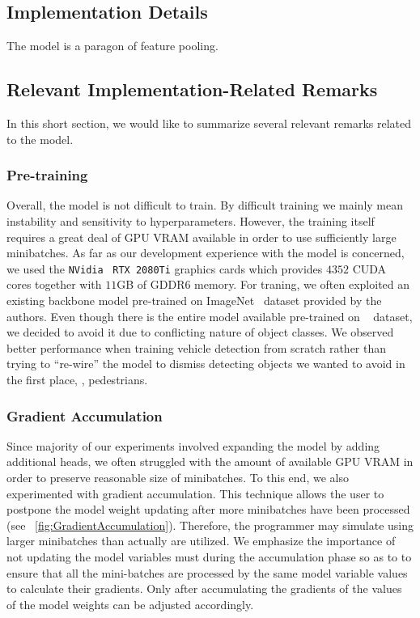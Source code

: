 \subsection{Implementation Details}

The \siammot{} model is a paragon of feature pooling.

\subsection{Relevant Implementation-Related Remarks}

In this short section, we would like to summarize several relevant remarks related to the \siammot{} model.

\subsubsection{Pre-training}

Overall, the model is not difficult to train. By difficult training we mainly mean instability and sensitivity to hyperparameters. However, the training itself requires a great deal of GPU VRAM available in order to use sufficiently large minibatches. As far as our development experience with the \siammot{} model is concerned, we used the \texttt{NVidia}~\cite{webnvidia} \texttt{RTX 2080Ti} graphics cards which provides $4352$ CUDA cores together with $11$GB of GDDR6 memory. For traning, we often exploited an existing backbone model pre-trained on ImageNet~\cite{deng2009imagenet} dataset provided by the authors. Even though there is the entire model available pre-trained on \mscoco{}~\cite{lin2014mscoco} dataset, we decided to avoid it due to conflicting nature of object classes. We observed better performance when training vehicle detection from scratch rather than trying to ``re-wire'' the model to dismiss detecting objects we wanted to avoid in the first place, \egtext{}, pedestrians.

\subsubsection{Gradient Accumulation}

Since majority of our experiments involved expanding the model by adding additional heads, we often struggled with the amount of available GPU VRAM in order to preserve reasonable size of minibatches. To this end, we also experimented with gradient accumulation. This technique allows the user to postpone the model weight updating after more minibatches have been processed (see \figtext{}~\ref{fig:GradientAccumulation}). Therefore, the programmer may simulate using larger minibatches than actually are utilized. We emphasize the importance of not updating the model variables must during the accumulation phase so as to to ensure that all the mini-batches are processed by the same model variable values to calculate their gradients. Only after accumulating the gradients of the values of the model weights can be adjusted accordingly.

